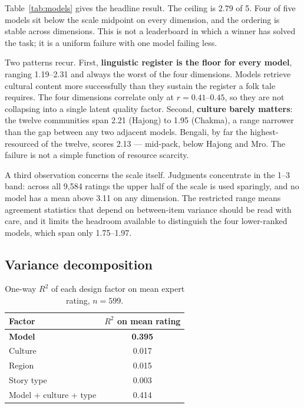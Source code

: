\documentclass[11pt]{article}
\begin{document}
Table~\ref{tab:models} gives the headline result.
The ceiling is 2.79 of 5.
Four of five models sit below the scale midpoint on every dimension, and the
ordering is stable across dimensions. This is not a leaderboard in which a
winner has solved the task; it is a uniform failure with one model failing
less.

Two patterns recur. First, \textbf{linguistic register is the floor for every
model}, ranging 1.19--2.31 and always the worst of the four dimensions. Models
retrieve cultural content more successfully than they sustain the register a
folk tale requires. The four dimensions correlate only at $r = 0.41$--$0.45$,
so they are not collapsing into a single latent quality factor. Second,
\textbf{culture barely matters}: the twelve communities span 2.21 (Hajong) to
1.95 (Chakma), a range narrower than the gap between any two adjacent models.
Bengali, by far the highest-resourced of the twelve, scores 2.13 --- mid-pack,
below Hajong and Mro. The failure is not a simple function of resource
scarcity.

A third observation concerns the scale itself. Judgments concentrate in the
1--3 band: across all 9{,}584 ratings the upper half of the scale is used
sparingly, and no model has a mean above 3.11 on any dimension. The restricted
range means agreement statistics that depend on between-item variance should be
read with care, and it limits the headroom available to distinguish the four
lower-ranked models, which span only 1.75--1.97.

\subsection{Variance decomposition}
\label{sec:variance}

\begin{table}[t]
\centering\small
\begin{tabular}{lc}
\toprule
Factor & $R^2$ on mean rating \\
\midrule
\textbf{Model}        & \textbf{0.395} \\
Culture               & 0.017 \\
Region                & 0.015 \\
Story type            & 0.003 \\
\midrule
Model + culture + type & 0.414 \\
\bottomrule
\end{tabular}
\caption{One-way $R^2$ of each design factor on mean expert rating,
$n = 599$.}
\label{tab:variance}
\end{table}
\end{document}
